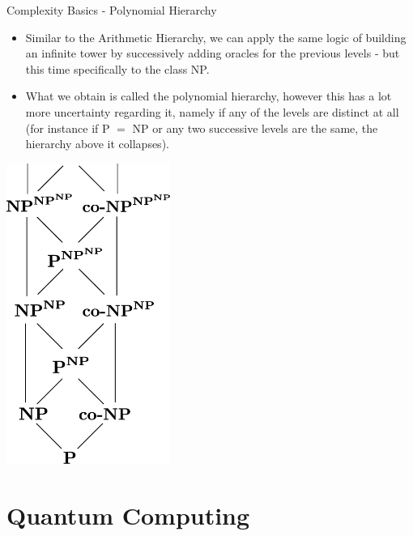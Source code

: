 \documentclass[aspectratio=169]{beamer}
\begin{document}
\begin{frame}{Complexity Basics - Polynomial Hierarchy}
  
  \begin{itemize}
    \item Similar to the Arithmetic Hierarchy, we can apply the same logic of building an infinite tower by successively adding oracles for the previous levels - but this time specifically to the class NP. \pause
    \item What we obtain is called the polynomial hierarchy, however this has a lot more uncertainty regarding it, namely if any of the levels are distinct at all (for instance if P $=$ NP or any two successive levels are the same, the hierarchy above it collapses). 
  \end{itemize}
  \begin{center}
    \includegraphics[width=0.4\textwidth, height=0.4\textheight, keepaspectratio]{polynomial hiearchy.png}
  \end{center}
\end{frame}

\section{Quantum Computing}
\frame{\sectionpage}
\end{document}
